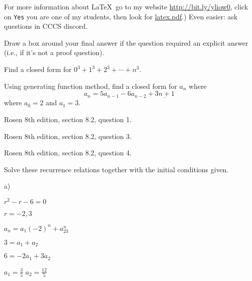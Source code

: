 For more information about \LaTeX\, go to my
website
\href{http://bit.ly/yliow0}{http://bit.ly/yliow0},
click on \verb!Yes!
you are one of my students,
then look for
\href{https://drive.google.com/file/d/0BzjYrK0VFuMWZm5xV0kyR3J2Zm8/view?usp=sharing}{latex.pdf}.)
Even easier: ask questions in CCCS discord.

Draw a box around your final answer if the question required
an explicit answer (i.e., if it's not a proof question).

\newpage


\newpage
\nextq Find a closed form for $0^3 + 1^3 + 2^3 + \cdots + n^3$.

\SOLUTION



\newpage
\nextq
Using generating function method, find a closed form for $a_n$ where
\[
a_n = 5a_{n-1} - 6a_{n-2} + \underline{3n + 1}
\]
where $a_0 = 2$ and $a_1 = 3$.

\SOLUTION



\newpage
\nextq Rosen 8th edition, section 8.2, question 1.

\SOLUTION



\newpage
\nextq Rosen 8th edition, section 8.2, question 3.

\SOLUTION



\newpage
\nextq Rosen 8th edition, section 8.2, question 4.

\SOLUTION
Solve these recurrence relations together with the initial
conditions given.

a)

$r^2 -r -6 = 0$

$r=-2,3$

$a_n = a_1(-2)^n + a_23^n$

$3 = a_1 + a_2$

$6= -2a_1 + 3a_2$

$a_1 = \frac{3}{5}$ $a_2 = \frac{12}{5}$

